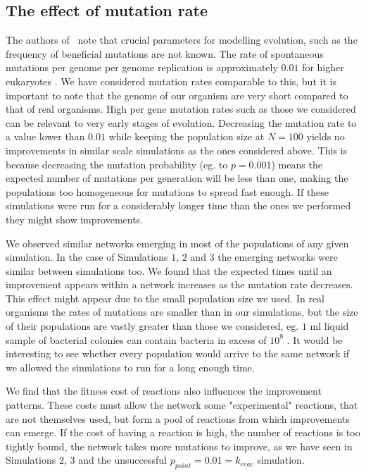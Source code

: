 \documentclass[a4paper,12pt]{article}
\begin{document}
\subsection{The effect of mutation rate}
\label{sub:on_the_effect_of_the_probability_of_mutation}


The authors of \cite{predictability}~note that crucial parameters for modelling evolution, such as the frequency of beneficial mutations are not known. The rate of spontaneous mutations per genome per genome replication is approximately $0.01$ for higher eukaryotes \cite{mutationrate}. We have considered mutation rates comparable to this, but it is important to note that the genome of our organism are very short compared to that of real organisms. High per gene mutation rates such as those we considered can be relevant to very early stages of evolution. Decreasing the mutation rate to a value lower than $0.01$ while keeping the population size at $N=100$ yields no improvements in similar scale simulations as the ones considered above. This is because decreasing the mutation probability (eg. to $p=0.001$) means the expected number of mutations per generation will be less than one, making the populations too homogeneous for mutations to spread fast enough. If these simulations were run for a considerably longer time than the ones we performed they might show improvements. 

We observed similar networks emerging in most of the populations of any given simulation. In the case of Simulations $1$, $2$ and $3$ the emerging networks were similar between simulations too. We found that the expected times until an improvement appears within a network increases as the mutation rate decreases. This effect might appear due to the small population size we used. In real organisms the rates of mutations are smaller than in our simulations, but the size of their populations are vastly greater than those we considered, eg. $1$ ml liquid sample of bacterial colonies can contain bacteria in excess of $10^9$ \cite{barteklecture}. It would be interesting to see whether every population would arrive to the same network if we allowed the simulations to run for a long enough time.

We find that the fitness cost of reactions also influences the improvement patterns. These costs must allow the network some "experimental" reactions, that are not themselves used, but form a pool of reactions from which improvements can emerge. If the cost of having a reaction is high, the number of reactions is too tightly bound, the network takes more mutations to improve, as we have seen in Simulations $2$, $3$ and the unsuccessful $p_{point}=0.01=k_{reac}$ simulation.
\end{document}
